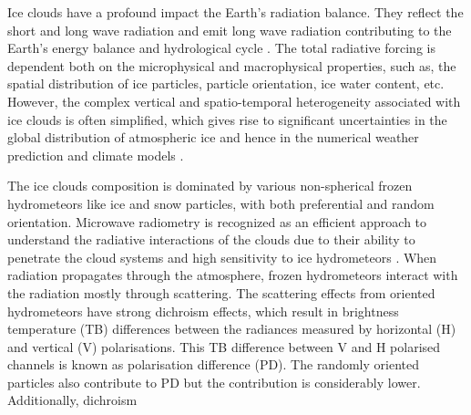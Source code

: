 \documentclass[amt, manuscript]{copernicus}
\begin{document}
Ice clouds have a profound impact the Earth's radiation balance. They reflect the short and long wave radiation and emit long wave radiation contributing to the Earth’s energy balance and hydrological cycle \citep{liou:influ:86}. The total radiative forcing is dependent both on the microphysical and macrophysical properties, such as, the spatial distribution of ice particles, particle orientation, ice water content, etc. However, the complex vertical and spatio-temporal heterogeneity associated with ice clouds is often simplified, which gives rise to significant uncertainties in the global distribution of atmospheric ice \citep{wilson:theim:00, duncan:anupd:18} and hence in the numerical weather prediction and climate models \citep{reinhardt:impac:04}.

The ice clouds composition is dominated by various non-spherical frozen hydrometeors like ice and snow particles, with both preferential and random orientation. Microwave radiometry is recognized as an efficient approach to understand the radiative interactions of the clouds due to their ability to penetrate the cloud systems and high sensitivity to ice hydrometeors \citep{vivekanandan:ice:91, janssen:atmos:94}. When radiation propagates through the atmosphere, frozen hydrometeors interact with the radiation mostly through scattering. The scattering effects from oriented hydrometeors have strong dichroism effects, which result in brightness temperature (TB) differences between the radiances measured by horizontal (H) and vertical (V) polarisations. This TB difference between V and H polarised channels is known as polarisation difference (PD). The randomly oriented particles also contribute to PD but the contribution is considerably lower. Additionally, dichroism
\end{document}
